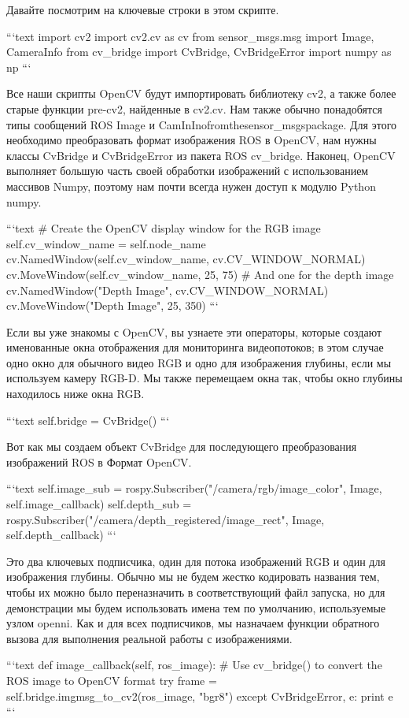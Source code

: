 Давайте посмотрим на ключевые строки в этом скрипте.

```text
import cv2
import cv2.cv as cv
from sensor_msgs.msg import Image, CameraInfo 
from cv_bridge import CvBridge, CvBridgeError 
import numpy as np
```

Все наши скрипты OpenCV будут импортировать библиотеку cv2, а также более старые функции pre-cv2, найденные в cv2.cv. Нам также обычно понадобятся типы сообщений ROS Image и CamInInofromthesensor\_msgspackage. Для этого необходимо преобразовать формат изображения ROS в OpenCV, нам нужны классы CvBridge и CvBridgeError из пакета ROS cv\_bridge. Наконец, OpenCV выполняет большую часть своей обработки изображений с использованием массивов Numpy, поэтому нам почти всегда нужен доступ к модулю Python numpy.

```text
# Create the OpenCV display window for the RGB image
self.cv_window_name = self.node_name
cv.NamedWindow(self.cv_window_name, cv.CV_WINDOW_NORMAL)
cv.MoveWindow(self.cv_window_name, 25, 75)
# And one for the depth image
cv.NamedWindow("Depth Image", cv.CV_WINDOW_NORMAL)
cv.MoveWindow("Depth Image", 25, 350)
```

Если вы уже знакомы с OpenCV, вы узнаете эти операторы, которые создают именованные окна отображения для мониторинга видеопотоков; в этом случае одно окно для обычного видео RGB и одно для изображения глубины, если мы используем камеру RGB-D. Мы также перемещаем окна так, чтобы окно глубины находилось ниже окна RGB.

```text
self.bridge = CvBridge()
```

Вот как мы создаем объект CvBridge для последующего преобразования изображений ROS в Формат OpenCV.

```text
self.image_sub = rospy.Subscriber("/camera/rgb/image_color", Image, self.image_callback)
self.depth_sub = rospy.Subscriber("/camera/depth_registered/image_rect",
Image, self.depth_callback)
```

Это два ключевых подписчика, один для потока изображений RGB и один для изображения глубины. Обычно мы не будем жестко кодировать названия тем, чтобы их можно было переназначить в соответствующий файл запуска, но для демонстрации мы будем использовать имена тем по умолчанию, используемые узлом openni. Как и для всех подписчиков, мы назначаем функции обратного вызова для выполнения реальной работы с изображениями.

```text
def image_callback(self, ros_image):
# Use cv_bridge() to convert the ROS image to OpenCV format try
frame = self.bridge.imgmsg_to_cv2(ros_image, "bgr8") except CvBridgeError, e:
print e
```

